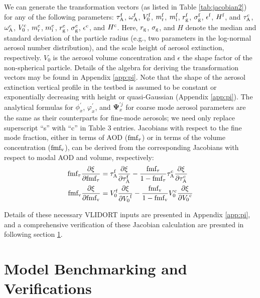 We can generate the transformation vectors (as listed in Table
\ref{tab:jacobian2}) for any of the following parameters: $\tau_\text{A}^\text{f}$, 
$\omega_\text{A}^\text{f}$, $V_0^\text{f}$, $m_\text{r}^\text{f}$, $m_\text{i}^\text{f}$, $r_\text{g}^\text{f}$,
$\sigma_\text{g}^\text{f}$, $\epsilon^\text{f}$, $H^\text{f}$, and $\tau_\text{A}^\text{c}$,
$\omega_\text{A}^\text{c}$, $V_0^\text{c}$, $m_\text{r}^\text{c}$, $m_\text{i}^\text{c}$,
$r_\text{g}^\text{c}$, $\sigma_\text{g}^\text{c}$, $\epsilon^\text{c}$, and $H^\text{c}$. Here,
$r_\text{g}$, $\sigma_\text{g}$, and $H$ denote the median and standard deviation of the
particle radius (e.g., two parameters in the log-normal aerosol number
distribution), and the scale height of aerosol extinction, respectively.
$V_0$ is the aerosol volume concentration and $\epsilon$ the shape 
factor of the non-spherical particle. Details of the algebra for deriving 
the transformation vectors may be found in Appendix \ref{app:pi}. 
Note that the shape of the aerosol extinction vertical profile in the
testbed is assumed to be constant or exponentially decreasing with
height or quasi-Gaussian (Appendix \ref{app:pi}). The analytical
formulas for $\phi_x^\prime$, $\varphi_x^\prime$, and
$\pmb{\Psi}_x^{\prime j}$ for coarse mode aerosol parameters are
the same as their counterparts for fine-mode aerosols; we need only
replace superscript “s” with “c” in Table 3 entries. Jacobians with
respect to the fine mode fraction, either in terms of AOD
($\text{fmf}_\tau$) or in terms of the volume concentration ($\text{fmf}_\text{v}$), 
can be derived from the corresponding Jacobians with respect to 
modal AOD and volume, respectively:
\begin{align}
\text{fmf}_\tau\frac{\partial\xi}{\partial\text{fmf}_\tau} & = 
   \tau_\text{A}^\text{f}\frac{\partial\xi}{\partial\tau_\text{A}^\text{f}} - 
   \frac{\text{fmf}_\tau}{1-\text{fmf}_\tau}\tau_\text{A}^\text{c}\frac{\partial\xi}{\partial\tau_\text{A}^\text{c}} \\
\text{fmf}_\text{v}\frac{\partial\xi}{\partial\text{fmf}_\text{v}} & = 
   V_0^\text{f}\frac{\partial\xi}{\partial{V_0}^\text{f}} - 
   \frac{\text{fmf}_\text{v}}{1-\text{fmf}_\text{v}}V_0^\text{c}\frac{\partial\xi}{\partial{V_0}^\text{c}}
\end{align}

Details of these necessary VLIDORT inputs are presented in Appendix
\ref{app:pi}, and a comprehensive verification of these Jacobian calculation are
presnted in following section {\ref{sec:rtmverify}}.

\section{Model Benchmarking and Verifications} \label{sec:rtmverify}

